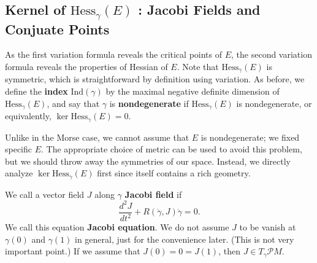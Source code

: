 \documentclass{article}
\newcommand{\PM}{\mathcal{P}M}
\newcommand{\g}{\gamma}
\newcommand{\Hess}{\mathrm{Hess}}
\newcommand{\Ind}{\mathrm{Ind}}
\begin{document}
\subsection{Kernel of $\Hess_\g(E)$ : Jacobi Fields and Conjuate Points}
As the first variation formula reveals the critical points of $E$, the second variation formula reveals the properties of Hessian of $E$.
Note that $\Hess_\g(E)$ is symmetric, which is straightforward by definition using variation.
As before, we define the \textbf{index} $\Ind(\g)$ by the maximal negative definite dimension of $\Hess_\g(E)$, and say that $\g$ is \textbf{nondegenerate} if $\Hess_\g(E)$ is nondegenerate, or equivalently, $\ker\Hess_\g(E)=0$.

Unlike in the Morse case, we cannot assume that $E$ is nondegenerate; we fixed specific $E$.
The appropriate choice of metric can be used to avoid this problem, but we should throw away the symmetries of our space.
Instead, we directly analyze $\ker\Hess_\g(E)$ first since itself contains a rich geometry.

We call a vector field $J$ along $\g$ \textbf{Jacobi field} if
	$$\frac{d^2J}{dt^2}+R(\dot{\g},J)\dot{\g}=0.$$
We call this equation \textbf{Jacobi equation}.
We do not assume $J$ to be vanish at $\g(0)$ and $\g(1)$ in general, just for the convenience later.
(This is not very important point.)
If we assume that $J(0)=0=J(1)$, then $J\in T_\g\PM$.
\end{document}
